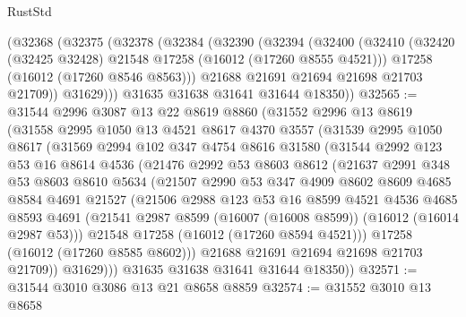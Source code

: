 \begin{lexlean}{RustStd}
\begin{coremodule}
    (@32368
      (@32375
        (@32378
          (@32384
            (@32390
              (@32394
                (@32400
                  (@32410
                    (@32420 (@32425 @32428) @21548 @17258 (@16012 (@17260 @8555 @4521)))
                    @17258
                    (@16012 (@17260 @8546 @8563)))
                  @21688
                  @21691
                  @21694
                  @21698
                  @21703
                  @21709))
              @31629)))
        @31635
        @31638
        @31641
        @31644
        @18350))
@32565 := @31544
    @2996
    @3087
    @13
    @22
    @8619
    @8860
    (@31552
      @2996
      @13
      @8619
      (@31558
        @2995
        @1050
        @13
        @4521
        @8617
        @4370
        @3557
        (@31539
          @2995
          @1050
          @8617
          (@31569
            @2994
            @102
            @347
            @4754
            @8616
            @31580
            (@31544
              @2992
              @123
              @53
              @16
              @8614
              @4536
              (@21476
                @2992
                @53
                @8603
                @8612
                (@21637
                  @2991
                  @348
                  @53
                  @8603
                  @8610
                  @5634
                  (@21507
                    @2990
                    @53
                    @347
                    @4909
                    @8602
                    @8609
                    @4685
                    @8584
                    @4691
                    @21527
                    (@21506
                      @2988
                      @123
                      @53
                      @16
                      @8599
                      @4521
                      @4536
                      @4685
                      @8593
                      @4691
                      (@21541 @2987 @8599 (@16007 (@16008 @8599)) (@16012 (@16014 @2987 @53)))
                      @21548
                      @17258
                      (@16012 (@17260 @8594 @4521)))
                    @17258
                    (@16012 (@17260 @8585 @8602)))
                  @21688
                  @21691
                  @21694
                  @21698
                  @21703
                  @21709))
              @31629)))
        @31635
        @31638
        @31641
        @31644
        @18350))
@32571 := @31544 @3010 @3086 @13 @21 @8658 @8859
@32574 := @31552 @3010 @13 @8658

\end{coremodule}
\end{lexlean}
